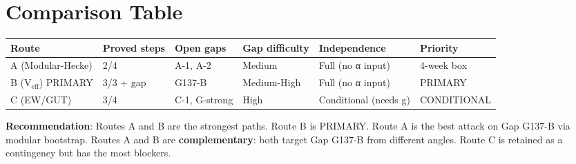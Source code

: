 \documentclass[12pt,a4paper]{article}
\theoremstyle{definition}
\theoremstyle{remark}
\begin{document}
\section{Comparison Table}
\label{sec:comparison}

\begin{center}
\begin{tabular}{llllll}
\toprule
\textbf{Route} & \textbf{Proved steps} & \textbf{Open gaps} & \textbf{Gap difficulty} & \textbf{Independence} & \textbf{Priority} \\
\midrule
A (Modular-Hecke) & 2/4 & A-1, A-2 & Medium & Full (no α input) & 4-week box \\
B (V$_{\mathrm{eff}}$) PRIMARY & 3/3 + gap & G137-B & Medium-High & Full (no α input) & PRIMARY \\
C (EW/GUT) & 3/4 & C-1, G-strong & High & Conditional (needs g) & CONDITIONAL \\
\bottomrule
\end{tabular}
\end{center}

\textbf{Recommendation}: Routes A and B are the strongest paths.
Route B is PRIMARY.
Route A is the best attack on Gap G137-B via modular bootstrap.
Routes A and B are \textbf{complementary}: both target Gap G137-B from different angles.
Route C is retained as a contingency but has the most blockers.

\ifdefined\INCLUDEMODE
\else
  
\end{document}
